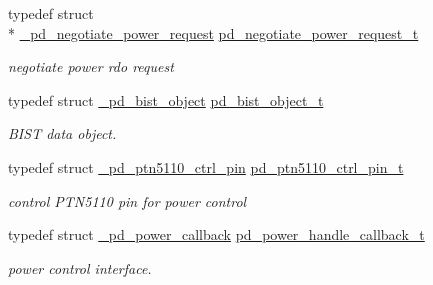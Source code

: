\begin{DoxyCompactItemize}
typedef struct \\*
\hyperlink{struct__pd__negotiate__power__request}{\-\_\-pd\-\_\-negotiate\-\_\-power\-\_\-request} \hyperlink{group__usb__pd__stack_ga0abf4b4d469dc62a548c2d41f6f4219b}{pd\-\_\-negotiate\-\_\-power\-\_\-request\-\_\-t}
\begin{DoxyCompactList}\small\item\em negotiate power rdo request \end{DoxyCompactList}\item 
typedef struct \hyperlink{struct__pd__bist__object}{\-\_\-pd\-\_\-bist\-\_\-object} \hyperlink{group__usb__pd__stack_ga812b5b90f650b07ee49c5ec4d2e24ebc}{pd\-\_\-bist\-\_\-object\-\_\-t}
\begin{DoxyCompactList}\small\item\em B\-I\-S\-T data object. \end{DoxyCompactList}\item 
typedef struct \hyperlink{struct__pd__ptn5110__ctrl__pin}{\-\_\-pd\-\_\-ptn5110\-\_\-ctrl\-\_\-pin} \hyperlink{group__usb__pd__stack_ga78181fa98a71e19526770f8c1adea957}{pd\-\_\-ptn5110\-\_\-ctrl\-\_\-pin\-\_\-t}
\begin{DoxyCompactList}\small\item\em control P\-T\-N5110 pin for power control \end{DoxyCompactList}\item 
typedef struct \hyperlink{struct__pd__power__callback}{\-\_\-pd\-\_\-power\-\_\-callback} \hyperlink{group__usb__pd__stack_gaf1142461de7d7dcc6268c286ba956265}{pd\-\_\-power\-\_\-handle\-\_\-callback\-\_\-t}
\begin{DoxyCompactList}\small\item\em power control interface. \end{DoxyCompactList}\end{DoxyCompactItemize}
